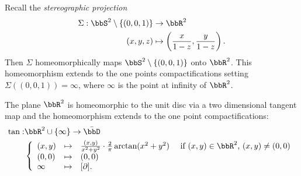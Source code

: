 Recall the \emph{stereographic projection}
\begin{align*}
 \Sigma : \bbS^2 \setminus \{ (0,0,1) \} &\to \bbR^2 \\
 (x,y,z) &\mapsto \left( \frac{x}{1-z}, \frac{y}{1-z} \right) .
\end{align*}
Then $\Sigma$ homeomorphically maps $\bbS^2 \setminus \{ (0,0,1) \}$ onto $\bbR^2$. This homeomorphism extends to the one points compactifications setting $\Sigma( (0,0,1) ) = \infty$, where $\infty$ is the point at infinity of $\bbR^2$.

The plane $\bbR^2$ is homeomorphic to the unit disc via a two dimensional tangent map and the homeomorphism extends to the one point compactifications:
\begin{align*}
 \tan : &\bbR^2 \cup \{ \infty\} \to \bar{\bbD} \\
&\left\{ \begin{array}{llll}
 (x,y) &\mapsto &\frac{(x,y)}{x^2 + y^2} \cdot \frac{2}{\pi}\arctan(x^2 + y^2) & \text{ if $(x,y) \in \bbR^2$, $(x,y) \neq (0,0)$} \\
 (0,0) &\mapsto &(0,0)\\
 \infty &\mapsto &[\partial].
        \end{array}\right.
\end{align*}


%
